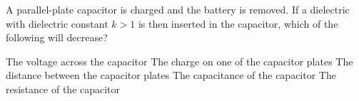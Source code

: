 \begin{questions}\setcounter{question}{24}\question
A parallel-plate capacitor is charged and the battery is removed. If a dielectric with dielectric constant $k>1$ is then inserted in the capacitor, which of the following will decrease?

\begin{choices}
\choice The voltage across the capacitor
\choice The charge on one of the capacitor plates
\choice The distance between the capacitor plates
\choice The capacitance of the capacitor
\choice The resistance of the capacitor
\end{choices}\end{questions}

